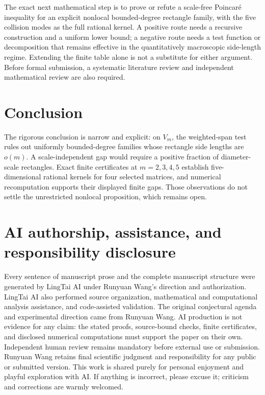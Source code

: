 \documentclass[11pt]{article}
\theoremstyle{definition}
\theoremstyle{remark}
\begin{document}
The exact next mathematical step is to prove or refute a scale-free
Poincar\'e inequality for an explicit nonlocal bounded-degree rectangle
family, with the five collision modes as the full rational kernel.  A
positive route needs a recursive construction and a uniform lower bound; a
negative route needs a test function or decomposition that remains effective
in the quantitatively macroscopic side-length regime.  Extending the finite
table alone is not a substitute for either argument.  Before formal submission, a systematic
literature review and independent mathematical review are also required.

\section{Conclusion}

The rigorous conclusion is narrow and explicit: on $V_m$, the weighted-span
test rules out uniformly bounded-degree families whose rectangle side lengths
are $o(m)$.  A scale-independent gap would require a positive fraction of
diameter-scale rectangles.  Exact finite certificates at $m=2,3,4,5$ establish
five-dimensional rational kernels for four selected matrices, and numerical
recomputation supports their displayed finite gaps.  Those observations do
not settle the unrestricted nonlocal proposition, which remains open.

\section*{AI authorship, assistance, and responsibility disclosure}

Every sentence of manuscript prose and the complete manuscript structure were
generated by LingTai AI under Runyuan Wang's direction and authorization.
LingTai AI also performed source organization, mathematical and computational
analysis assistance, and code-assisted validation.  The original conjectural
agenda and experimental direction came from Runyuan Wang.  AI production is
not evidence for any claim: the stated proofs, source-bound checks, finite
certificates, and disclosed numerical computations must support the paper on
their own.  Independent human review remains mandatory before external use or
submission.  Runyuan Wang retains final scientific judgment and responsibility
for any public or submitted version.  This work is shared purely for personal
enjoyment and playful exploration with AI.  If anything is incorrect, please
excuse it; criticism and corrections are warmly welcomed.



\end{document}
